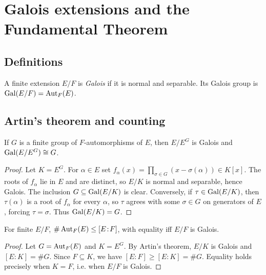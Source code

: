 \section{Galois extensions and the Fundamental Theorem}\label{sec:galois-ft}

\subsection{Definitions}
\begin{definition}
A finite extension $E/F$ is \emph{Galois} if it is normal and separable. Its Galois group is $\operatorname{Gal}(E/F)=\operatorname{Aut}_F(E)$.
\end{definition}

\subsection{Artin's theorem and counting}
\begin{theorem}[Artin]
If $G$ is a finite group of $F$-automorphisms of $E$, then $E/E^G$ is Galois and $\operatorname{Gal}(E/E^G)\cong G$.
\end{theorem}
\begin{proof}
Let $K=E^G$. For $\alpha\in E$ set
\(f_\alpha(x)=\prod_{\sigma\in G}(x-\sigma(\alpha))\in K[x]\). The roots of
$f_\alpha$ lie in $E$ and are distinct, so $E/K$ is normal and separable, hence
Galois. The inclusion $G\subseteq\operatorname{Gal}(E/K)$ is clear. Conversely, if
$\tau\in\operatorname{Gal}(E/K)$, then $\tau(\alpha)$ is a root of $f_\alpha$ for every
$\alpha$, so $\tau$ agrees with some $\sigma\in G$ on generators of $E$, forcing
$\tau=\sigma$. Thus $\operatorname{Gal}(E/K)=G$.
\end{proof}
\begin{theorem}[Counting]
For finite $E/F$, $\#\operatorname{Aut}_F(E)\le [E\!:\!F]$, with equality iff $E/F$ is Galois.
\end{theorem}
\begin{proof}
Let $G=\operatorname{Aut}_F(E)$ and $K=E^G$. By Artin's theorem, $E/K$ is Galois and
$[E\!:\!K]=\#G$. Since $F\subseteq K$, we have $[E\!:\!F]\ge [E\!:\!K]=\#G$.
Equality holds precisely when $K=F$, i.e. when $E/F$ is Galois.
\end{proof}

